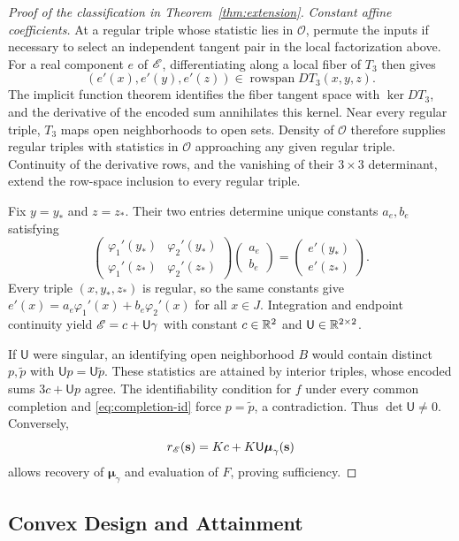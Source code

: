 \begin{proof}[Proof of the classification in Theorem~\ref{thm:extension}]
\emph{Constant affine coefficients.} At a regular triple whose statistic lies in $\mathcal O$, permute the inputs if necessary to select an independent tangent pair in the local factorization above. For a real component $e$ of $\mathscr E$, differentiating along a local fiber of $T_3$ then gives
$$
 (e'(x),e'(y),e'(z))\in\operatorname{rowspan}DT_3(x,y,z).
$$
The implicit function theorem identifies the fiber tangent space with $\ker DT_3$, and the derivative of the encoded sum annihilates this kernel. Near every regular triple, $T_3$ maps open neighborhoods to open sets. Density of $\mathcal O$ therefore supplies regular triples with statistics in $\mathcal O$ approaching any given regular triple. Continuity of the derivative rows, and the vanishing of their $3\times3$ determinant, extend the row-space inclusion to every regular triple.

Fix $y=y_*$ and $z=z_*$. Their two entries determine unique constants $a_e,b_e$ satisfying
$$
 \begin{pmatrix}\varphi_1'(y_*)&\varphi_2'(y_*)\\
 \varphi_1'(z_*)&\varphi_2'(z_*)\end{pmatrix}
 \begin{pmatrix}a_e\\b_e\end{pmatrix}
 =\begin{pmatrix}e'(y_*)\\e'(z_*)\end{pmatrix}.
$$
Every triple $(x,y_*,z_*)$ is regular, so the same constants give $e'(x)=a_e\varphi_1'(x)+b_e\varphi_2'(x)$ for all $x\in J$. Integration and endpoint continuity yield $\mathscr E=c+\mathsf U\gamma$ with constant $c\in\mathbb R^2$ and $\mathsf U\in\mathbb R^{2\times2}$.

If $\mathsf U$ were singular, an identifying open neighborhood $B$ would contain distinct $p,\widetilde p$ with $\mathsf Up=\mathsf U\widetilde p$. These statistics are attained by interior triples, whose encoded sums $3c+\mathsf Up$ agree. The identifiability condition for $f$ under every common completion and \eqref{eq:completion-id} force $p=\widetilde p$, a contradiction. Thus $\det\mathsf U\ne0$. Conversely,
$$
 r_\mathscr E(\mathbf s)=Kc+K\mathsf U\boldsymbol\mu_\gamma(\mathbf s)
$$
allows recovery of $\boldsymbol\mu_\gamma$ and evaluation of $F$, proving sufficiency.
\end{proof}

\subsection{Convex Design and Attainment}

